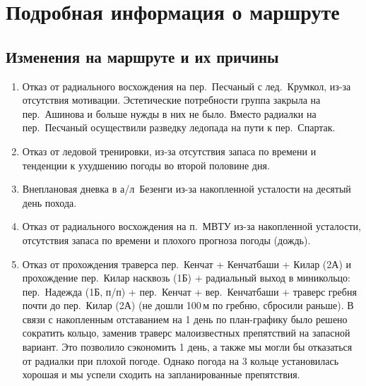 \section{Подробная информация о маршруте}\label{sec:route}
	\subsection{Изменения на маршруте и их причины}\label{subsec:changes_of_way}
		\begin{enumerate}
			\item Отказ от радиального восхождения на пер.~Песчаный с лед.~Крумкол, из-за отсутствия мотивации.
			Эстетические потребности группа закрыла на пер.~Ашинова и больше нужды в них не было. Вместо радиалки
			на пер.~Песчаный осуществили разведку ледопада на пути к пер.~Спартак.
			\item Отказ от ледовой тренировки, из-за отсутствия запаса по времени и тенденции к ухудшению погоды
			во второй половине дня.
			\item Внеплановая дневка в а/л~Безенги из-за накопленной усталости на десятый день похода.
			\item Отказ от радиального восхождения на п.~МВТУ из-за накопленной усталости, отсутствия запаса по
			времени и плохого прогноза погоды (дождь).
			\item Отказ от прохождения траверса пер.~Кенчат + Кенчатбаши + Килар (2А) и прохождение пер.~Килар
			насквозь (1Б) + радиальный выход в миникольцо: пер.~Надежда (1Б, п/п) + пер.~Кенчат + вер.~Кенчатбаши +
			траверс гребня почти до пер.~Килар (2А) (не дошли 100\,м по гребню, сбросили раньше). В связи с накопленным
			отставанием на 1 день по план-графику было решено сократить кольцо, заменив траверс малоизвестных препятствий
			на запасной вариант. Это позволило сэкономить 1 день, а также мы могли бы отказаться от радиалки при плохой
			погоде. Однако погода на 3 кольце установилась хорошая и мы успели сходить на запланированные препятствия.
		\end{enumerate}
	
	
